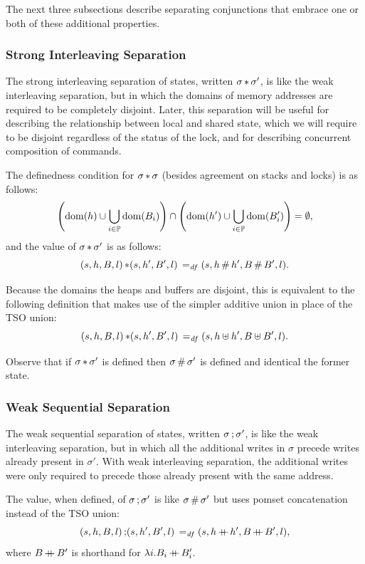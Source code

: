 \documentclass[11pt]{article}
\begin{document}
The next three subsections describe separating conjunctions that embrace one or both of these additional properties. 

\subsubsection{Strong Interleaving Separation}

The strong interleaving separation of states, written $\sigma \operatorname{\ast} \sigma'$, is like the weak interleaving separation, but in which the domains of memory addresses are required to be completely disjoint. Later, this separation will be useful for describing the relationship between local and shared state, which we will require to be disjoint regardless of the status of the lock, and for describing concurrent composition of commands.

 The definedness condition for $\sigma \operatorname{\ast} \sigma$ (besides agreement on stacks and locks) is as follows: \[ \left(\operatorname{\mathrm{dom}}(h) \cup \bigcup_{i \in \mathbb{P}} \operatorname{\mathrm{dom}}(B_i) \right) \cap \left( \operatorname{\mathrm{dom}}(h') \cup \bigcup_{i \in \mathbb{P}} \operatorname{\mathrm{dom}}(B'_i)\right) = \operatorname{\emptyset}, \] and the value of $\sigma \operatorname{\ast} \sigma'$ is as follows: \[ (s,h,B,l) \operatorname{\ast} (s,h',B',l) \operatorname{\;=_{\mathit{df}}\;} (s,h\operatorname{\#} h',B\operatorname{\#} B',l).\] 

Because the domains the heaps and buffers are disjoint, this is equivalent to the following definition that makes use of the simpler additive union in place of the TSO union: \[ (s,h,B,l) \operatorname{\ast} (s,h',B',l) \operatorname{\;=_{\mathit{df}}\;} (s,h\uplus h',B\uplus B',l).\] 

Observe that if $\sigma \operatorname{\ast} \sigma'$ is defined then $\sigma \operatorname{\#} \sigma'$ is defined and identical the former state. 

\subsubsection{Weak Sequential Separation}

The weak sequential separation of states, written $\sigma \operatorname{;} \sigma'$, is like the weak interleaving separation, but in which all the additional writes in $\sigma$ precede writes already present in $\sigma'$. With weak interleaving separation, the additional writes were only required to precede those already present with the same address. 

The value, when defined, of $\sigma \operatorname{;} \sigma'$ is like $\sigma \operatorname{\#} \sigma'$ but uses pomset concatenation instead of the TSO union: \[ (s,h,B,l) \operatorname{;} (s,h',B',l) \operatorname{\;=_{\mathit{df}}\;} (s,h \operatorname{+\!\!\!+} h',B \operatorname{+\!\!\!+} B',l),\] where $B \operatorname{+\!\!\!+} B'$ is shorthand for $\lambda i . B_i \operatorname{+\!\!\!+} B'_i$. 
\end{document}
